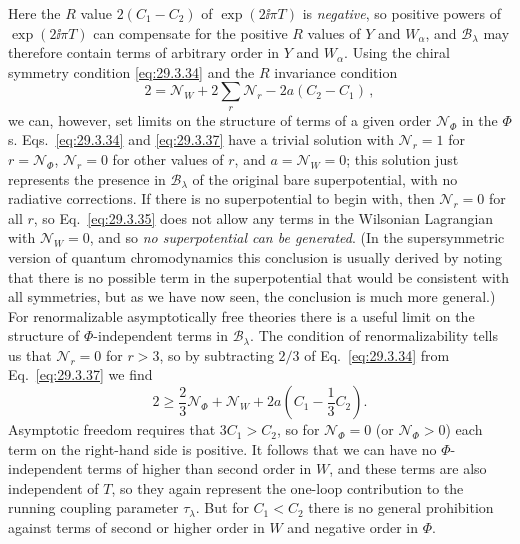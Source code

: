 Here the \(R\) value \(2(C_1-C_2)\) of \(\exp(2\ii\pi T)\) is
\emph{negative}, so positive powers of \(\exp(2\ii\pi T)\) can compensate
for the positive \(R\) values of \(Y\) and \(W_\alpha\), and
\(\mathcal{B}_\lambda\) may therefore contain terms of arbitrary order in
\(Y\) and \(W_\alpha\). Using the chiral symmetry condition
\eqref{eq:29.3.34} and the \(R\) invariance condition
\begin{equation}
  2
  =
  \mathcal{N}_W
  +2\sum_r\mathcal{N}_r
  -2a(C_2-C_1)\,,
  \tag{29.3.37}\label{eq:29.3.37}
\end{equation}
we can, however, set limits on the structure of terms of a given order
\(\mathcal{N}_\Phi\) in the \(\Phi\)s. Eqs.~\eqref{eq:29.3.34} and
\eqref{eq:29.3.37} have a trivial solution with \(\mathcal{N}_r=1\) for
\(r=\mathcal{N}_\Phi\), \(\mathcal{N}_r=0\) for other values of \(r\),
and \(a=\mathcal{N}_W=0\); this solution just represents the presence in
\(\mathcal{B}_\lambda\) of the original bare superpotential, with no
radiative corrections. If there is no superpotential to begin with, then
\(\mathcal{N}_r=0\) for all \(r\), so Eq.~\eqref{eq:29.3.35} does not
allow any terms in the Wilsonian Lagrangian with \(\mathcal{N}_W=0\), and
so \emph{no superpotential can be generated}. (In the supersymmetric
version of quantum chromodynamics this conclusion is usually derived by
noting that there is no possible term in the superpotential that would be
consistent with all symmetries, but as we have now seen, the conclusion is
much more general.) For renormalizable asymptotically free theories there
is a useful limit on the structure of \(\Phi\)-independent terms in
\(\mathcal{B}_\lambda\). The condition of renormalizability tells us that
\(\mathcal{N}_r=0\) for \(r>3\), so by subtracting \(2/3\) of
Eq.~\eqref{eq:29.3.34} from Eq.~\eqref{eq:29.3.37} we find
\begin{equation}
  2
  \geq
  \frac23\mathcal{N}_\Phi
  +\mathcal{N}_W
  +2a\left(C_1-\frac13C_2\right).
  \tag{29.3.38}\label{eq:29.3.38}
\end{equation}
Asymptotic freedom requires that \(3C_1>C_2\), so for
\(\mathcal{N}_\Phi=0\) (or \(\mathcal{N}_\Phi>0\)) each term on the
right-hand side is positive. It follows that we can have no
\(\Phi\)-independent terms of higher than second order in \(W\), and these
terms are also independent of \(T\), so they again represent the one-loop
contribution to the running coupling parameter \(\tau_\lambda\). But for
\(C_1<C_2\) there is no general prohibition against terms of second or
higher order in \(W\) and negative order in \(\Phi\).

